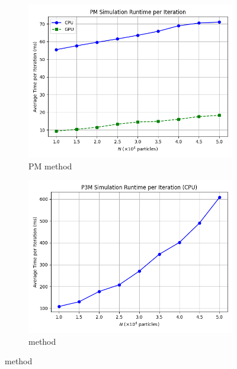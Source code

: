 \begin{figure}[!ht]
    \centering
    \begin{subfigure}[b]{0.48\textwidth}
        \centering
        \includegraphics[width=\linewidth]{chapters/results/img/perf/pm_time.png}
        \caption{PM method}
        \label{fig:pm-running-time}
    \end{subfigure}
    \hfill
    \begin{subfigure}[b]{0.48\textwidth}
        \centering
        \includegraphics[width=\linewidth]{chapters/results/img/perf/p3m_time.png}
        \caption{\PThreeM{} method}
        \label{fig:p3m-running-time}
    \end{subfigure}


\end{figure}
